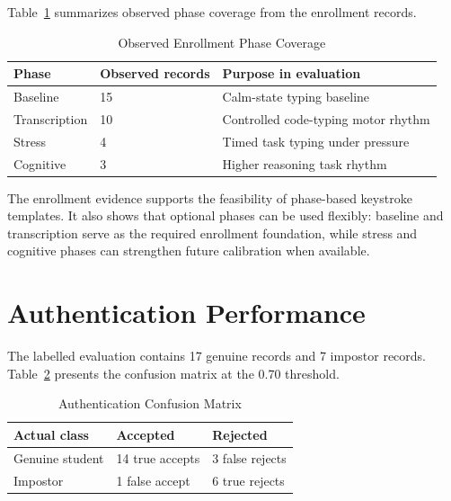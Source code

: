 Table~\ref{tab:phase-coverage} summarizes observed phase coverage from the enrollment records.

\begin{table}[H]
  \centering
  \caption{Observed Enrollment Phase Coverage}
  \label{tab:phase-coverage}
  \begin{singlespace}
  \begin{tabularx}{\textwidth}{@{}p{4.0cm}p{3.0cm}p{5.4cm}@{}}
    \toprule
    \textbf{Phase} & \textbf{Observed records} & \textbf{Purpose in evaluation} \\
    \midrule
    Baseline & 15 & Calm-state typing baseline \\
    Transcription & 10 & Controlled code-typing motor rhythm \\
    Stress & 4 & Timed task typing under pressure \\
    Cognitive & 3 & Higher reasoning task rhythm \\
    \bottomrule
  \end{tabularx}
  \end{singlespace}
\end{table}

The enrollment evidence supports the feasibility of phase-based keystroke templates. It also shows that optional phases can be used flexibly: baseline and transcription serve as the required enrollment foundation, while stress and cognitive phases can strengthen future calibration when available.

\section{Authentication Performance}
\label{sec:authentication-performance}

The labelled evaluation contains 17 genuine records and 7 impostor records. Table~\ref{tab:confusion-matrix} presents the confusion matrix at the 0.70 threshold.

\begin{table}[H]
  \centering
  \caption{Authentication Confusion Matrix}
  \label{tab:confusion-matrix}
  \begin{singlespace}
  \begin{tabularx}{\textwidth}{@{}p{4.0cm}p{4.0cm}p{4.0cm}@{}}
    \toprule
    \textbf{Actual class} & \textbf{Accepted} & \textbf{Rejected} \\
    \midrule
    Genuine student & 14 true accepts & 3 false rejects \\
    Impostor & 1 false accept & 6 true rejects \\
    \bottomrule
  \end{tabularx}
  \end{singlespace}
\end{table}

